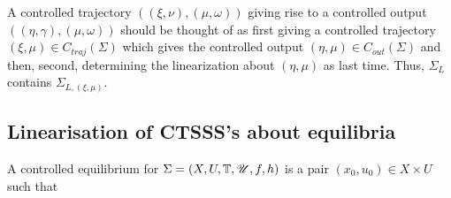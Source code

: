 A controlled trajectory $\left( \left( \xi, \nu \right) , \left( \mu, \omega \right)  \right) $ giving rise to a controlled output $\left( \left( \eta, \gamma \right) , \left( \mu, \omega \right)  \right) $ should be thought of as first giving a controlled trajectory $\left( \xi, \mu \right) \in C_{traj}\left( \Sigma \right) $ which gives the controlled output $\left( \eta, \mu \right) \in C_{out}\left( \Sigma \right) $ and then, second, determining the linearization about $\left( \eta, \mu \right) $ as last time. Thus, $\Sigma_{L}$ contains $\Sigma_{L, \left( \xi, \mu \right) }$.

\subsection{Linearisation of CTSSS's about equilibria}

\begin{definition}
	A controlled equilibrium for $\Sigma = \left( X, U, \mathbb{T} , \mathscr{U}, f, h \right) $ is a pair $\left( x_0, u_0 \right) \in X \times  U$ such that 
	
\end{definition}
